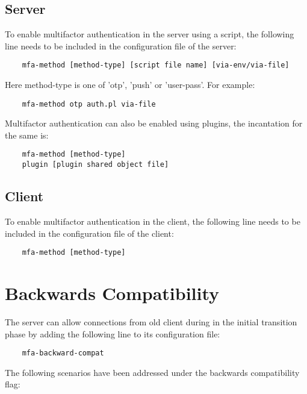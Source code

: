 \documentclass[11pt,oneside]{book}
\begin{document}
\subsection{Server}
To enable multifactor authentication in the server using a script, the following line needs to be
included in the configuration file of the server:

\begin{verbatim}
    mfa-method [method-type] [script file name] [via-env/via-file]
\end{verbatim}

\noindent Here method-type is one of 'otp', 'push' or 'user-pass'. For example:
\begin{verbatim}
    mfa-method otp auth.pl via-file
\end{verbatim}

\noindent Multifactor authentication can also be enabled using plugins, the incantation for the same is:
\begin{verbatim}
    mfa-method [method-type]
    plugin [plugin shared object file]
\end{verbatim}

\subsection{Client}
To enable multifactor authentication in the client, the following line needs to be included in the
configuration file of the client:

\begin{verbatim}
    mfa-method [method-type]
\end{verbatim}

\section{Backwards Compatibility}
\label{MFA:BackwardCompat}
The server can allow connections from old client during in the initial transition phase by adding
the following line to its configuration file:

\begin{verbatim}
    mfa-backward-compat
\end{verbatim}

The following scenarios have been addressed under the backwards compatibility flag:\\
\end{document}
